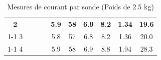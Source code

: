 \begin{table}[H]
{\begin{tabular}{|c|c|c|c|c|c|c|c|c|c|}
            2         &                                                            &                           &                                                                                        & 5.9                                                      & 58                                                      & 6.9                                                                 & 8.2                                                              & 1.34   & 19.6                                                               \\ \cline{1-1} \cline{5-10}
            3         &                                                            &                           &                                                                                        & 5.8                                                      & 57                                                      & 6.8                                                                 & 8.2                                                              & 1.36   & 20.0                                                               \\ \cline{1-1} \cline{5-10}
            4         &                                                            &                           &                                                                                        & 5.9                                                      & 58                                                      & 6.9                                                                 & 8.8                                                              & 1.94   & 28.3                                                               \\ \hline
        \end{tabular}%
    }
    \caption{Mesures de courant par sonde (Poids de 2.5 kg)}
    \label{tab:poids_2_5_sonde}
\end{table}

